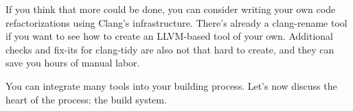 If you think that more could be done, you can consider writing your own code refactorizations using Clang's infrastructure. There's already a clang-rename tool if you want to see how to create an LLVM-based tool of your own. Additional checks and fix-its for clang-tidy are also not that hard to create, and they can save you hours of manual labor.

You can integrate many tools into your building process. Let's now discuss the heart of the process: the build system.












